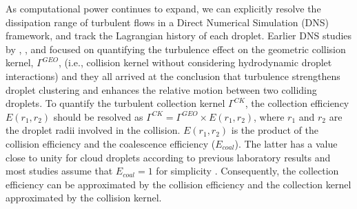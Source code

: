 As computational power continues to expand, we can explicitly resolve the dissipation range of turbulent flows in a Direct Numerical Simulation (DNS) framework, and track the Lagrangian history of each droplet. Earlier DNS studies by \citet{Franklin2005,Franklin2007}, \citet{Ayala2008a}, and \citet{Chen2016} focused on quantifying the turbulence effect on the geometric collision kernel, $\Gamma^{GEO}$, (i.e., collision kernel without considering hydrodynamic droplet interactions) and they all arrived at the conclusion that turbulence strengthens droplet clustering and enhances the relative motion between two colliding droplets. To quantify the turbulent collection kernel $\Gamma^{CK}$, the collection efficiency $E(r_1,r_2)$ should be resolved as $\Gamma^{CK}=\Gamma^{GEO}\times E(r_1,r_2)$, where $r_1$ and $r_2$ are the droplet radii involved in the collision. $E(r_1,r_2)$ is the product of the collision efficiency and the coalescence efficiency ($E_{coal}$). The latter has a value close to unity for cloud droplets according to previous laboratory results \citep[Fig. 14-10 (a) of][]{Pruppacher1997} and most studies assume that $E_{coal}=1$ for simplicity \citep{Rogers1989}. Consequently, the collection efficiency can be approximated by the collision efficiency and the collection kernel approximated by the collision kernel.

